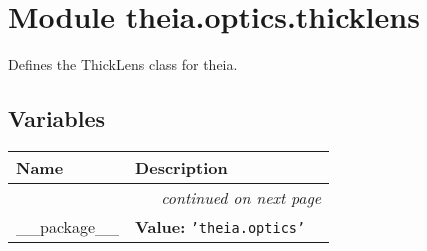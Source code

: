%
%
%


\section{Module theia.optics.thicklens}

    \label{theia:optics:thicklens}
Defines the ThickLens class for theia.



  \subsection{Variables}

    \vspace{-1cm}
\hspace{\varindent}\begin{longtable}{|p{\varnamewidth}|p{\vardescrwidth}|l}
\cline{1-2}
\cline{1-2} \centering \textbf{Name} & \centering \textbf{Description}& \\
\cline{1-2}
\endhead\cline{1-2}\multicolumn{3}{r}{\small\textit{continued on next page}}\\\endfoot\cline{1-2}
\endlastfoot\raggedright \_\-\_\-p\-a\-c\-k\-a\-g\-e\-\_\-\_\- & \raggedright \textbf{Value:} 
{\tt \texttt{'}\texttt{theia.optics}\texttt{'}}&\\
\cline{1-2}
\end{longtable}



